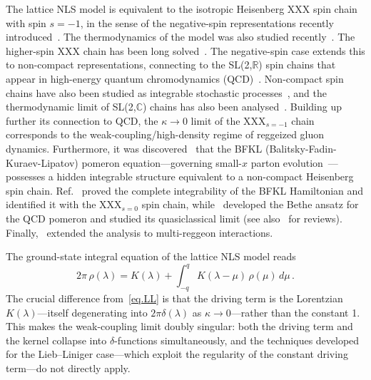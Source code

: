 \documentclass[11pt,a4paper]{article}
\theoremstyle{definition}
\begin{document}
The lattice NLS model is equivalent to the isotropic Heisenberg XXX spin chain
with spin $s=-1$, in the sense of the negative-spin representations recently
introduced~\cite{HaoEtAl2019}. The thermodynamics of the model was also studied recently~\cite{ZhongEtAl2025}.
The higher-spin XXX chain has been long
solved~\cite{KulishReshetikhin1981,KirillovReshetikhin1986}. 
The negative-spin case extends this to non-compact representations, connecting to the
SL(2,$\mathbb{R}$) spin chains that appear in high-energy quantum chromodynamics (QCD)~\cite{KirchManashov2004,DerkachovKorchemskyManashov2001,
DerkachovKorchemskyManashov2002,DerkachovKorchemskyManashov2003}.
Non-compact spin chains have also been studied as integrable stochastic
processes~\cite{FrassekGiardinaKurchan2020},
and the thermodynamic limit of SL(2,$\mathbb{C}$) chains has also been analysed~\cite{GranetJacobsenSaleur2020}.
Building up further its connection to QCD, the $\kappa\to 0$ limit of the XXX$_{s=-1}$ chain corresponds to the
weak-coupling/high-density regime of reggeized gluon dynamics. Furthermore, it was discovered~\cite{Lipatov1993,Lipatov1994,Lipatov1995,Lipatov1997} that the
BFKL (Balitsky-Fadin-Kuraev-Lipatov) pomeron equation---governing small-$x$ parton
evolution~\cite{FadinKuraevLipatov1975,KuraevLipatovFadin1976,KuraevLipatovFadin1977,
BalitskyLipatov1978}---possesses a hidden integrable structure equivalent to a
non-compact Heisenberg spin chain. Ref.~\cite{FaddeevKorchemsky1995} proved the complete integrability of
the BFKL Hamiltonian and identified it with the XXX$_{s=0}$ spin chain, while~\cite{Korchemsky1995,Korchemsky1996,Korchemsky1997} developed the Bethe
ansatz for the QCD pomeron and studied its quasiclassical limit (see
also~\cite{BelitskyBraunGorskyKorchemsky2004,Korchemsky2012} for reviews).
Finally,~\cite{deVegaLipatov2001} extended the analysis to multi-reggeon
interactions. 



The ground-state integral equation of the lattice NLS model reads
\begin{equation}\label{eq.latticeNLS}
  2\pi\,\rho(\lambda)
  = K(\lambda)
  + \int_{-q}^{q} K(\lambda -\mu)\,\rho(\mu)\,d\mu\,.
\end{equation}
The crucial difference from~\eqref{eq.LL} is that the driving term is the
Lorentzian $K(\lambda)$---itself degenerating into
$2\pi\delta(\lambda)$ as $\kappa\to 0$---rather than the constant 1.
This makes the weak-coupling limit doubly singular: both the driving term and
the kernel collapse into $\delta$-functions simultaneously, and the techniques
developed for the Lieb--Liniger case---which exploit the regularity of the constant
driving term---do not directly apply.
\end{document}

